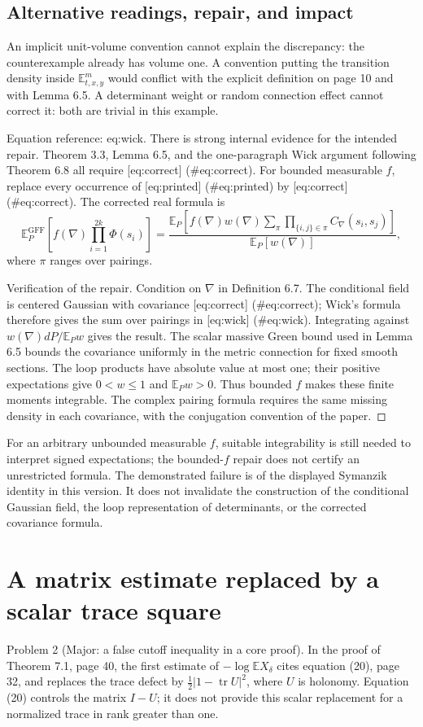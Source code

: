 \documentclass[10pt]{article}
\begin{document}
\subsection*{Alternative readings, repair, and impact}
An implicit unit-volume convention cannot explain the discrepancy: the counterexample already has volume one. A convention putting the transition density inside \(\mathbb E^m_{t,x,y}\) would conflict with the explicit definition on page 10 and with Lemma 6.5. A determinant weight or random connection effect cannot correct it: both are trivial in this example.\par
Equation reference: eq:wick. There is strong internal evidence for the intended repair. Theorem 3.3, Lemma 6.5, and the one-paragraph Wick argument following Theorem 6.8 all require [eq:correct] (\#eq:correct). For bounded measurable \(f\), replace every occurrence of [eq:printed] (\#eq:printed) by [eq:correct] (\#eq:correct). The corrected real formula is \[
 \mathbb E^{\mathrm{GFF}}_P
 \!\left[f(\nabla)\prod_{i=1}^{2k}\Phi(s_i)\right]
 =
 \frac{\displaystyle
 \mathbb E_P\!\left[f(\nabla)w(\nabla)
   \sum_{\pi}\prod_{\{i,j\}\in\pi}C_\nabla(s_i,s_j)\right]}
 {\mathbb E_P[w(\nabla)]},\] where \(\pi\) ranges over pairings.\par
Verification of the repair. Condition on \(\nabla\) in Definition 6.7. The conditional field is centered Gaussian with covariance [eq:correct] (\#eq:correct); Wick’s formula therefore gives the sum over pairings in [eq:wick] (\#eq:wick). Integrating against \(w(\nabla)dP/\mathbb E_Pw\) gives the result. The scalar massive Green bound used in Lemma 6.5 bounds the covariance uniformly in the metric connection for fixed smooth sections. The loop products have absolute value at most one; their positive expectations give \(0<w\leq1\) and \(\mathbb E_Pw>0\). Thus bounded \(f\) makes these finite moments integrable. The complex pairing formula requires the same missing density in each covariance, with the conjugation convention of the paper. ◻\par
For an arbitrary unbounded measurable \(f\), suitable integrability is still needed to interpret signed expectations; the bounded-\(f\) repair does not certify an unrestricted formula. The demonstrated failure is of the displayed Symanzik identity in this version. It does not invalidate the construction of the conditional Gaussian field, the loop representation of determinants, or the corrected covariance formula.\par
\section*{A matrix estimate replaced by a scalar trace square}
Problem 2 (Major: a false cutoff inequality in a core proof).  In the proof of Theorem 7.1, page 40, the first estimate of \(-\log\mathbb EX_\delta\) cites equation (20), page 32, and replaces the trace defect by \(\tfrac12|1-\operatorname{tr}U|^2\), where \(U\) is holonomy. Equation (20) controls the matrix \(I-U\); it does not provide this scalar replacement for a normalized trace in rank greater than one.\par
\end{document}
